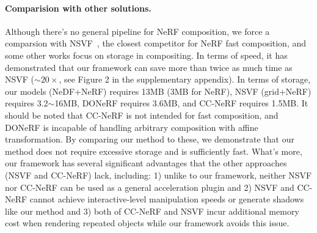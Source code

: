 \documentclass[letterpaper]{article} %
\begin{document}
\paragraph{Comparision with other solutions.} Although there's no general pipeline for NeRF composition, we force a comparsion with NSVF~\cite{liu2020neural}, the closest competitor for
NeRF fast composition, and some other works focus on storage in compositing. In terms of speed, it has demonstrated that our framework can save more than twice as much time as NSVF ($\sim 20 \times$, see Figure 2 in the supplementary appendix). In terms of storage, our
models (NeDF+NeRF) requires 13MB (3MB for NeRF), NSVF (grid+NeRF) requires 3.2$\sim$16MB, DONeRF requires 3.6MB, and CC-NeRF requires 1.5MB. It should be noted that CC-NeRF is not intended for fast composition, and DONeRF is incapable of
handling arbitrary composition with affine transformation.
By comparing our method to these, we demonstrate that our method does not require excessive storage and is sufficiently
fast. What's more, our framework has several significant advantages that the other approaches (NSVF and CC-NeRF) lack, including:
1) unlike to our framework, neither NSVF nor CC-NeRF can be used as a general acceleration plugin
and 2) NSVF and CC-NeRF cannot achieve interactive-level manipulation speeds or generate shadows like our method and 3) both of CC-NeRF and NSVF incur additional memory cost when rendering repeated objects while our framework avoids this issue.
\end{document}
